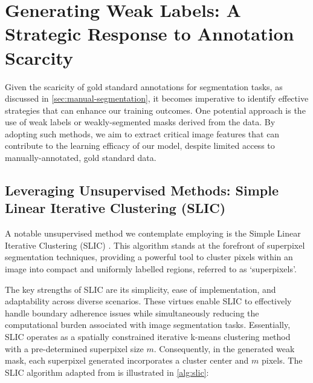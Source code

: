 \section{Generating Weak Labels: A Strategic Response to Annotation Scarcity}

Given the scaricity of gold standard annotations for segmentation tasks, as discussed in \autoref{sec:manual-segmentation}, it becomes imperative to identify effective strategies that can enhance our training outcomes. One potential approach is the use of weak labels or weakly-segmented masks derived from the data. By adopting such methods, we aim to extract critical image features that can contribute to the learning efficacy of our model, despite limited access to manually-annotated, gold standard data.

\subsection{Leveraging Unsupervised Methods: Simple Linear Iterative Clustering (SLIC)}

A notable unsupervised method we contemplate employing is the Simple Linear Iterative Clustering (SLIC) \cite{achanta2010slic}. This algorithm stands at the forefront of superpixel segmentation techniques, providing a powerful tool to cluster pixels within an image into compact and uniformly labelled regions, referred to as `superpixels'.

The key strengths of SLIC are its simplicity, ease of implementation, and adaptability across diverse scenarios. These virtues enable SLIC to effectively handle boundary adherence issues while simultaneously reducing the computational burden associated with image segmentation tasks. Essentially, SLIC operates as a spatially constrained iterative k-means clustering method with a pre-determined superpixel size \(m\). Consequently, in the generated weak mask, each superpixel generated incorporates a cluster center and \(m\) pixels. The SLIC algorithm adapted from \cite{achanta2010slic} is illustrated in \autoref{alg:slic}:

